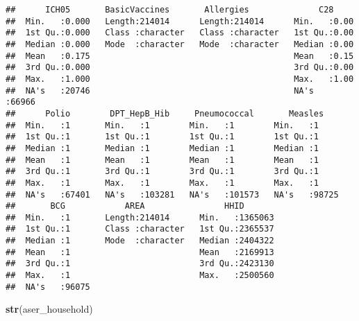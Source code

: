 \documentclass[
]{article}
\newenvironment{Shaded}{\begin{snugshade}}{\end{snugshade}}
\newcommand{\FunctionTok}[1]{\textcolor[rgb]{0.13,0.29,0.53}{\textbf{#1}}}
\newcommand{\NormalTok}[1]{#1}
\begin{document}
\begin{verbatim}
##      ICH05       BasicVaccines       Allergies              C28       
##  Min.   :0.000   Length:214014      Length:214014      Min.   :0.00   
##  1st Qu.:0.000   Class :character   Class :character   1st Qu.:0.00   
##  Median :0.000   Mode  :character   Mode  :character   Median :0.00   
##  Mean   :0.175                                         Mean   :0.15   
##  3rd Qu.:0.000                                         3rd Qu.:0.00   
##  Max.   :1.000                                         Max.   :1.00   
##  NA's   :20746                                         NA's   :66966  
##      Polio        DPT_HepB_Hib     Pneumococcal       Measles     
##  Min.   :1       Min.   :1        Min.   :1        Min.   :1      
##  1st Qu.:1       1st Qu.:1        1st Qu.:1        1st Qu.:1      
##  Median :1       Median :1        Median :1        Median :1      
##  Mean   :1       Mean   :1        Mean   :1        Mean   :1      
##  3rd Qu.:1       3rd Qu.:1        3rd Qu.:1        3rd Qu.:1      
##  Max.   :1       Max.   :1        Max.   :1        Max.   :1      
##  NA's   :67401   NA's   :103281   NA's   :101573   NA's   :98725  
##       BCG            AREA                HHID        
##  Min.   :1       Length:214014      Min.   :1365063  
##  1st Qu.:1       Class :character   1st Qu.:2365537  
##  Median :1       Mode  :character   Median :2404322  
##  Mean   :1                          Mean   :2169913  
##  3rd Qu.:1                          3rd Qu.:2423130  
##  Max.   :1                          Max.   :2500560  
##  NA's   :96075
\end{verbatim}

\begin{Shaded}
\begin{Highlighting}[]
\FunctionTok{str}\NormalTok{(aser\_household)}
\end{Highlighting}
\end{Shaded}
\end{document}
